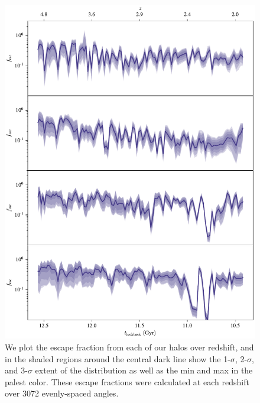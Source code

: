 \begin{figure}
    \centering
    \includegraphics[width=\textwidth,height=0.85\textheight,keepaspectratio]{figures/los.pdf}
    \caption{
        We plot the escape fraction from each of our halos over redshift, and in the shaded regions around the central dark line show the 1-$\sigma$, 2-$\sigma$, and 3-$\sigma$ extent of the distribution as well as the min and max in the palest color.
        These escape fractions were calculated at each redshift over 3072 evenly-spaced angles.
    }
    \label{fig:los}
\end{figure}
